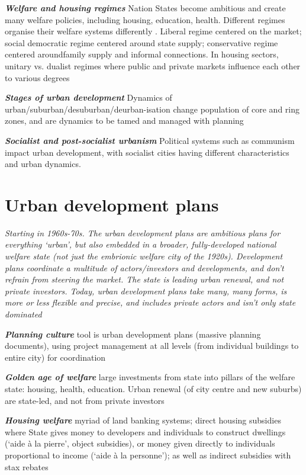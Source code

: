 \documentclass{article}
\newcommand{\bisection}[1]{\textbf{\textit{#1}}}
\newcommand{\alignedmarginpar}[1]{%
        \marginpar{\raggedright\small #1}
    }
\begin{document}
\bisection{Welfare and housing regimes} Nation States become ambitious and create many welfare policies, including housing, education, health. Different regimes organise their welfare systems differently\alignedmarginpar{Welfare triangle}. Liberal regime centered on the market; social democratic regime centered around state supply; conservative regime centered aroundfamily supply and informal connections. In housing sectors, unitary vs. dualist regimes where public and private markets influence each other to various degrees

\bisection{Stages of urban development} Dynamics of urban/suburban/desuburban/deurban-isation change population of core and ring zones, and are dynamics to be tamed and managed with planning

\bisection{Socialist and post-socialist urbanism} Political systems such as communism impact urban development, with socialist cities having different characteristics and urban dynamics.

\pagebreak
\section{Urban development plans}

\textit{Starting in 1960s-70s. The urban development plans are ambitious plans for everything `urban', but also embedded in a broader, fully-developed national welfare state (not just the embrionic welfare city of the 1920s). Development plans coordinate a multitude of actors/investors and developments, and don't refrain from steering the market. The state is leading urban renewal, and not private investors. Today, urban development plans take many, many forms, is more or less flexible and precise, and includes private actors and isn't only state dominated}

\bisection{Planning culture} tool is urban development plans (massive planning documents), using project management at all levels (from individual buildings to entire city) for coordination

\bisection{Golden age of welfare}\alignedmarginpar{Sweden's distinct regime} large investments from state into pillars of the welfare state: housing, health, education. Urban renewal (of city centre and new suburbs) are state-led, and not from private investors

\bisection{Housing welfare} myriad of land banking systems; direct housing subsidies where State gives money to developers and individuals to construct dwellings (`aide à la pierre', object subsidies), or money given directly to individuals proportional to income (`aide à la personne'); as well as indirect subsidies with stax rebates
\end{document}
